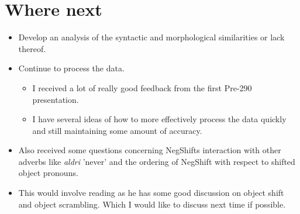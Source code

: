 \documentclass[12pt, letterpaper]{article}
\begin{document}
\section*{Where next} \label{sec:next}
\begin{itemize}
	\item Develop an analysis of the syntactic and morphological similarities or lack thereof. 
	\item Continue to process the data. 
		\begin{itemize}
			\item I received a lot of really good feedback from the first Pre-290 presentation.
			\item I have several ideas of how to more effectively process the data quickly and still maintaining some amount of accuracy. 
		\end{itemize}
	\item Also received some questions concerning NegShifts interaction with other adverbs like \textit{aldri} 'never' and the ordering of NegShift with respect to shifted object pronouns. 
	\item This would involve reading \cite{broekhuisUnificationObjectShift2020} as he has some good discussion on object shift and object scrambling. Which I would like to discuss next time if possible.
\end{itemize}


\printbibliography
\end{document}
